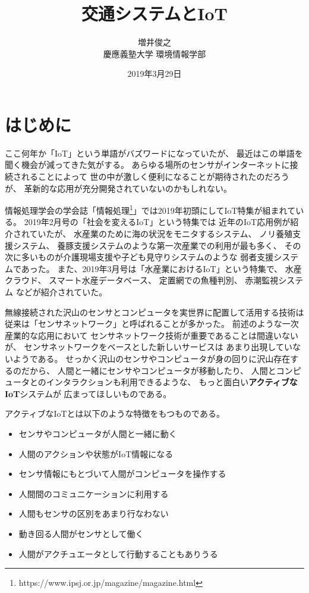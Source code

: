 \documentclass[twocolumn,10pt]{jarticle}
\title{交通システムとIoT}
\author{増井俊之 \\ 慶應義塾大学 環境情報学部}
\date{2019年3月29日}
\begin{document}
\maketitle

\thispagestyle{empty}


\section{はじめに}
  
ここ何年か「IoT」という単語がバズワードになっていたが、
最近はこの単語を聞く機会が減ってきた気がする。
あらゆる場所のセンサがインターネットに接続されることによって
世の中が激しく便利になることが期待されたのだろうが、
革新的な応用が充分開発されていないのかもしれない。

情報処理学会の学会誌「情報処理\footnote{
  \textsf{https://www.ipsj.or.jp/magazine/magazine.html}
}」では2019年初頭にしてIoT特集が組まれている。
2019年2月号の「社会を変えるIoT」という特集では
近年のIoT応用例が紹介されていたが、
水産業のために海の状況をモニタするシステム、
ノリ養殖支援システム、
養豚支援システムのような第一次産業での利用が最も多く、
その次に多いものが介護現場支援や子ども見守りシステムのような
弱者支援システムであった。
また、2019年3月号は「水産業におけるIoT」という特集で、
水産クラウド、
スマート水産データベース、
定置網での魚種判別、
赤潮監視システム
などが紹介されていた。

無線接続された沢山のセンサとコンピュータを実世界に配置して活用する技術は
従来は「センサネットワーク」と呼ばれることが多かった。
前述のような一次産業的な応用において
センサネットワーク技術が重要であることは間違いないが、
センサネットワークをベースとした新しいサービスは
あまり出現していないようである。
せっかく沢山のセンサやコンピュータが身の回りに沢山存在するのだから、
人間と一緒にセンサやコンピュータが移動したり、
人間とコンピュータとのインタラクションも利用できるような、
もっと面白い\textbf{アクティブなIoT}システムが
広まってほしいものである。

アクティブなIoTとは以下のような特徴をもつものである。

\begin{itemize}
  \setlength{\itemsep}{0cm} %
  \item センサやコンピュータが人間と一緒に動く
  \item 人間のアクションや状態がIoT情報になる
  \item センサ情報にもとづいて人間がコンピュータを操作する
  \item 人間間のコミュニケーションに利用する
  \item 人間もセンサの区別をあまり行なわない
  \item 動き回る人間がセンサとして働く
  \item 人間がアクチュエータとして行動することもありうる
\end{itemize}
\end{document}
